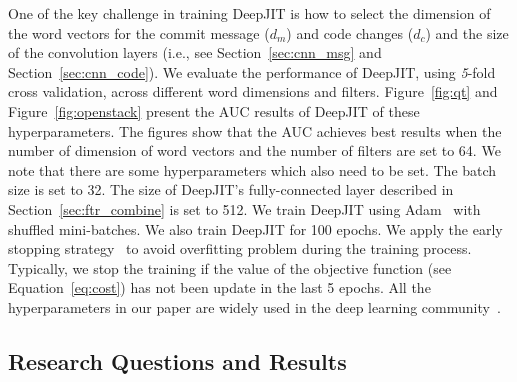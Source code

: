 One of the key challenge in training DeepJIT is how to select the dimension of the word vectors for the commit message ($d_m$) and code changes ($d_c$) and the size of the convolution layers (i.e., see Section~\ref{sec:cnn_msg} and Section~\ref{sec:cnn_code}). We evaluate the performance of DeepJIT, using \textit{5}-fold cross validation, across different word dimensions and filters. Figure~\ref{fig:qt} and Figure~\ref{fig:openstack} present the AUC results of DeepJIT of these hyperparameters. The figures show that the AUC achieves best results when the number of dimension of word vectors and the number of filters are set to 64. We note that there are some hyperparameters which also need to be set. The batch size is set to 32. The size of DeepJIT's fully-connected layer described in Section~\ref{sec:ftr_combine} is set to 512. We train DeepJIT using Adam~\cite{kingma2014adam} with shuffled mini-batches. We also train DeepJIT for 100 epochs. We apply the early stopping strategy~\cite{prechelt1998automatic, caruana2001overfitting} to avoid overfitting problem during the training process. Typically, we stop the training if the value of the objective function (see Equation~\ref{eq:cost}) has not been update in the last 5 epochs. All the hyperparameters in our paper are widely used in the deep learning community~\cite{severyn2015learning, huo2016learning, huo2017enhancing, hinton2012improving}.

 
 

\subsection{Research Questions and Results}
\label{sec:rq_results}

